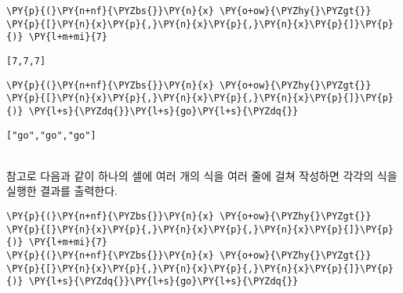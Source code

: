     \begin{tcolorbox}[breakable, size=fbox, boxrule=1pt, pad at break*=1mm,colback=cellbackground, colframe=cellborder]
\begin{Verbatim}[commandchars=\\\{\}]
\PY{p}{(}\PY{n+nf}{\PYZbs{}}\PY{n}{x} \PY{o+ow}{\PYZhy{}\PYZgt{}} \PY{p}{[}\PY{n}{x}\PY{p}{,}\PY{n}{x}\PY{p}{,}\PY{n}{x}\PY{p}{]}\PY{p}{)} \PY{l+m+mi}{7}
\end{Verbatim}
\end{tcolorbox}

    
    \begin{Verbatim}[commandchars=\\\{\}]
[7,7,7]
    \end{Verbatim}

    
    \begin{tcolorbox}[breakable, size=fbox, boxrule=1pt, pad at break*=1mm,colback=cellbackground, colframe=cellborder]
\begin{Verbatim}[commandchars=\\\{\}]
\PY{p}{(}\PY{n+nf}{\PYZbs{}}\PY{n}{x} \PY{o+ow}{\PYZhy{}\PYZgt{}} \PY{p}{[}\PY{n}{x}\PY{p}{,}\PY{n}{x}\PY{p}{,}\PY{n}{x}\PY{p}{]}\PY{p}{)} \PY{l+s}{\PYZdq{}}\PY{l+s}{go}\PY{l+s}{\PYZdq{}}
\end{Verbatim}
\end{tcolorbox}

    
    \begin{Verbatim}[commandchars=\\\{\}]
["go","go","go"]
    \end{Verbatim}

    ~\\[.25ex]\noindent
    참고로 다음과 같이 하나의 셀에 여러 개의 식을 여러 줄에 걸쳐 작성하면
각각의 식을 실행한 결과를 출력한다.

    \begin{tcolorbox}[breakable, size=fbox, boxrule=1pt, pad at break*=1mm,colback=cellbackground, colframe=cellborder]
\begin{Verbatim}[commandchars=\\\{\}]
\PY{p}{(}\PY{n+nf}{\PYZbs{}}\PY{n}{x} \PY{o+ow}{\PYZhy{}\PYZgt{}} \PY{p}{[}\PY{n}{x}\PY{p}{,}\PY{n}{x}\PY{p}{,}\PY{n}{x}\PY{p}{]}\PY{p}{)} \PY{l+m+mi}{7}
\PY{p}{(}\PY{n+nf}{\PYZbs{}}\PY{n}{x} \PY{o+ow}{\PYZhy{}\PYZgt{}} \PY{p}{[}\PY{n}{x}\PY{p}{,}\PY{n}{x}\PY{p}{,}\PY{n}{x}\PY{p}{]}\PY{p}{)} \PY{l+s}{\PYZdq{}}\PY{l+s}{go}\PY{l+s}{\PYZdq{}}
\end{Verbatim}
\end{tcolorbox}


